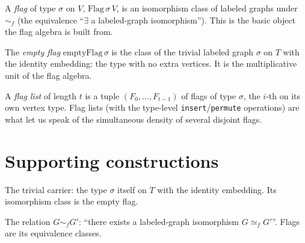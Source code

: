 \begin{definition}[Flag]
  \label{def:flag}
  \leanok
  A \emph{flag} of type $\sigma$ on $V$, $\mathrm{Flag}\,\sigma\,V$, is an
  isomorphism class of labeled graphs under $\sim_f$ (the equivalence
  ``$\exists$ a labeled-graph isomorphism''). This is the basic object the flag
  algebra is built from.
\end{definition}

\begin{definition}
  \label{def:empty-flag}
  \leanok
  The \emph{empty flag} $\mathrm{emptyFlag}\,\sigma$ is the class of the trivial
  labeled graph $\sigma$ on $T$ with the identity embedding: the type with no
  extra vertices. It is the multiplicative unit of the flag algebra.
\end{definition}

\begin{definition}
  \label{def:flag-list}
  \leanok
  A \emph{flag list} of length $t$ is a tuple $(F_0,\dots,F_{t-1})$ of flags of
  type $\sigma$, the $i$-th on its own vertex type. Flag lists (with the
  type-level \texttt{insert}/\texttt{permute} operations) are what let us speak
  of the simultaneous density of several disjoint flags.
\end{definition}

\section{Supporting constructions}

\begin{definition}
  \label{def:empty-labeled-graph}
  \leanok
  The trivial carrier: the type $\sigma$ itself on $T$ with the identity
  embedding. Its isomorphism class is the empty flag.
\end{definition}

\begin{definition}
  \label{def:flag-eqv}
  \leanok
  The relation $G \sim_f G'$: ``there exists a labeled-graph isomorphism
  $G \simeq_f G'$''. Flags are its equivalence classes.
\end{definition}

